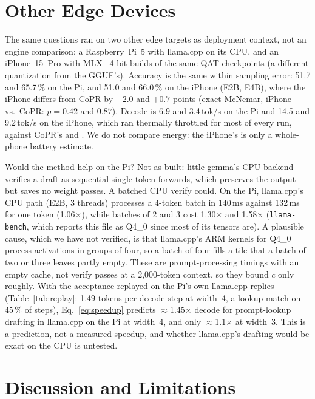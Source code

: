 \documentclass[lettersize,journal]{IEEEtran}
\newcommand{\sys}{CoPR}
\newcommand{\lc}{llama.cpp}
\newcommand{\lgm}{little-gemma}
\begin{document}
\section{Other Edge Devices}\label{sec:devices}

The same questions ran on two other edge targets as deployment context, not an
engine comparison: a Raspberry~Pi~5 with \lc{} on its CPU, and an iPhone~15~Pro
with MLX~\cite{mlx} 4-bit builds of the same QAT checkpoints (a different
quantization from the GGUF's). Accuracy is the same within sampling error:
51.7 and 65.7\,\% on the Pi, and 51.0 and 66.0\,\% on the iPhone (E2B, E4B),
where the iPhone differs from \sys{} by $-2.0$ and $+0.7$ points (exact
McNemar, iPhone vs.\ \sys{}: $p{=}0.42$ and $0.87$). Decode is 6.9 and 3.4\,tok/s on the Pi and 14.5
and 9.2\,tok/s on the iPhone, which ran thermally throttled for most of every
run, against \sys{}'s \EtwoDecA{} and \EfourDecA{}. We do not compare energy: the
iPhone's is only a whole-phone battery estimate.

Would the method help on the Pi? Not as built: \lgm{}'s CPU backend verifies a
draft as sequential single-token forwards, which preserves the output but saves
no weight passes. A batched CPU verify could. On the Pi, \lc{}'s CPU path
(E2B, 3 threads) processes a 4-token batch in 140\,ms against 132\,ms for one
token (1.06$\times$), while batches of 2 and 3 cost 1.30$\times$ and
1.58$\times$ (\texttt{llama-bench}, which reports this file as Q4\_0 since most
of its tensors are). A plausible cause, which we have not verified, is that
\lc{}'s ARM kernels for Q4\_0 process activations in groups of four, so a
batch of four fills a tile that a batch of two or three leaves partly empty.
These are prompt-processing timings with an empty cache, not verify passes at
a 2{,}000-token context, so they bound $c$ only roughly. With the acceptance
replayed on the Pi's own \lc{} replies (Table~\ref{tab:replay}: 1.49 tokens
per decode step at width~4, a lookup match on 45\,\% of steps),
Eq.~\eqref{eq:speedup} predicts $\approx$1.45$\times$ decode for prompt-lookup
drafting in \lc{} on the Pi at width~4, and only $\approx$1.1$\times$ at
width~3. This is a prediction, not a measured speedup, and whether \lc{}'s
drafting would be exact on the CPU is untested.

\section{Discussion and Limitations}\label{sec:limits}
\end{document}
